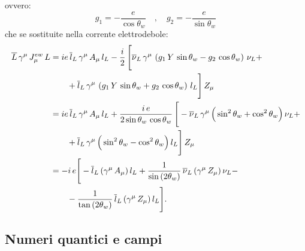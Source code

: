 ovvero:
\begin{equation}
    g_1 = -\frac{e}{\cos\theta_w}\quad , \quad g_2 = -\frac{e}{\sin\theta_w}
\end{equation}
che se sostituite nella corrente elettrodebole:
\begin{align}
    \overline{L}\, \gamma^\mu\, J_\mu^{ew}\, L &= ie\, \overline{l}_L\, \gamma^\mu\, A_\mu\, l_L - \frac{i}{2}\, \Bigg[ \overline{\nu}_L\, \gamma^\mu\, \left( g_1\, Y\, \sin\theta_w - g_2\, \cos\theta_w \right)\, \nu_L + \notag \\
    &\qquad + \overline{l}_L\, \gamma^\mu\, \left( g_1\, Y\, \sin\theta_w + g_2\, \cos\theta_w \right)\, l_L \Bigg]\, Z_\mu \\
    &= ie\, \overline{l}_L\, \gamma^\mu\, A_\mu\, l_L + \frac{i\, e}{2\sin\theta_w\, \cos\theta_w}\, \Bigg[ -\overline{\nu}_L\, \gamma^\mu\, \Big( \sin^2\theta_w + \cos^2\theta_w \Big)\, \nu_L + \notag \\
    &\qquad + \overline{l}_L\, \gamma^\mu\, \Big( \sin^2\theta_w - \cos^2\theta_w \Big)\, l_L \Bigg]\, Z_\mu \\
    &= -i\, e\Bigg[ -\overline{l}_L\, (\gamma^\mu\, A_\mu)\, l_L + \frac{1}{\sin{(2\theta_w)}}\, \overline{\nu}_L\, (\gamma^\mu\, Z_\mu)\, \nu_L - \notag \\
    &\qquad - \frac{1}{\tan{(2\theta_w)}}\, \overline{l}_L\, (\gamma^\mu\, Z_\mu)\, l_L \Bigg].
\end{align}


\subsection{Numeri quantici e campi}

